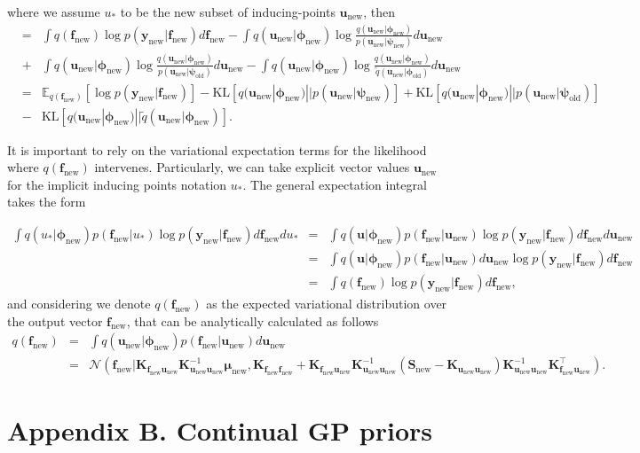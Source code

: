 \documentclass[]{article}
\def\K{{\mathbf K}}
\def\S{{\mathbf S}}
\def\u{{\mathbf u}}
\def\f{{\mathbf f}}
\newcommand{\psiold}{{\bm{\psi}_{\text{old}}}}
\newcommand{\psinew}{{\bm{\psi}_{\text{new}}}}
\newcommand{\unew}{{\u_{\text{new}}}}
\newcommand{\fnew}{{\f_{\text{new}}}}
\newcommand{\Ncal}{\mathcal{N}}
\newcommand{\yc}{\bm{y}}
\newcommand{\ycnew}{{\yc_{\text{new}}}}
\newcommand{\phiold}{{\bm{\phi}_{\text{old}}}}
\newcommand{\phinew}{{\bm{\phi}_{\text{new}}}}
\begin{document}
where we assume $u_{*}$ to be the new subset of inducing-points $\unew$, then
\begin{eqnarray}
&=& \int q(\fnew) \log p(\ycnew| \fnew)d\fnew - \int q(\unew|\phinew) \log \frac{q(\unew|\phinew)}{p(\unew|\psinew)}d\unew \nonumber\\
&+& \int q(\unew|\phinew) \log \frac{q(\unew|\phinew)}{p(\unew|\psiold)}d\unew - \int q(\unew|\phinew) \log \frac{q(\unew|\phinew)}{\widetilde{q}(\unew|\phiold)}d\unew \\
&=& \mathbb{E}_{q(\fnew)}[\log p(\ycnew|\fnew)] - \text{KL}[q(\unew|\phinew) || p(\unew|\psinew) ] + \text{KL}[q(\unew|\phinew) || p(\unew|\psiold) ] \nonumber\\
&-& \text{KL}[q(\unew|\phinew)||\widetilde{q}(\unew|\phinew) ].
\end{eqnarray}

It is important to rely on the variational expectation terms for the likelihood where $q(\fnew)$ intervenes. Particularly, we can take explicit vector values $\unew$ for the implicit inducing points notation $u_{*}$. The general expectation integral takes the form

\begin{eqnarray}
	\int q(u_{*}|\phinew)p(\fnew|u_{*}) \log p(\ycnew| \fnew )d\fnew du_{*} 
	&=& \int q(\u|\phinew)p(\fnew|\unew) \log p(\ycnew| \fnew )d\fnew d\unew \nonumber \\
	&=& \int q(\u|\phinew)p(\fnew|\unew) d\unew \log p(\ycnew| \fnew )d\fnew \nonumber \\
	&=& \int q(\fnew) \log p(\ycnew| \fnew )d\fnew,
\end{eqnarray}
and considering we denote $q(\fnew)$ as the expected variational distribution over the output vector $\fnew$, that can be analytically calculated as follows
\begin{eqnarray}
	q(\fnew) &=& \int q(\unew|\phinew)p(\fnew|\unew) d\unew \nonumber\\
	&=& \Ncal (\fnew| \K_{\fnew\unew}\K^{-1}_{\unew\unew}\bm{\mu}_{\text{new}}, \K_{\fnew\fnew} + \K_{\fnew\unew}\K^{-1}_{\unew\unew}(\S_\text{new} - \K_{\unew\unew})\K^{-1}_{\unew\unew}\K^{\top}_{\fnew\unew} ). \nonumber
\end{eqnarray}



\section*{Appendix B. Continual GP priors}
\label{app:gradients}
\end{document}
